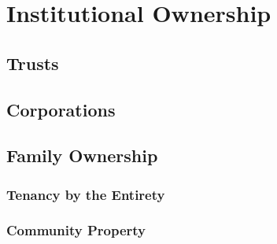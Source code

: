 \chapter{Institutional Ownership}



\section{Trusts}






\begin{questions}

\end{questions}


\section{Corporations}





\begin{questions}

\end{questions}

\section{Family Ownership}



\subsection{Tenancy by the Entirety}



\begin{questions}

\end{questions}

\subsection{Community Property}



